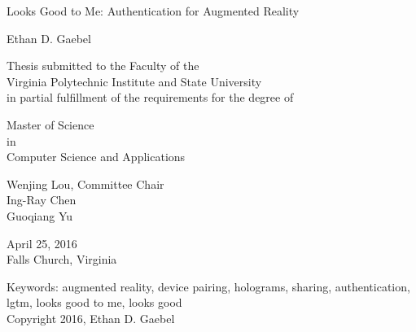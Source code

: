 \documentclass[12pt]{report}
\begin{document}
\thispagestyle{empty}
\begin{center}

{\Large 
Looks Good to Me: 
Authentication for Augmented Reality
}

\vfill

Ethan D. Gaebel

\vfill

Thesis submitted to the Faculty of the \\
Virginia Polytechnic Institute and State University \\
in partial fulfillment of the requirements for the degree of

\vfill

Master of Science \\
in \\
Computer Science and Applications

\vfill

Wenjing Lou, Committee Chair \\
Ing-Ray Chen \\
Guoqiang Yu 

\vfill

April 25, 2016 \\
Falls Church, Virginia

\vfill

Keywords: augmented reality, device pairing, holograms, sharing, authentication, lgtm, looks good to me, looks good
\\
Copyright 2016, Ethan D. Gaebel

\end{center}

\pagebreak
\end{document}
